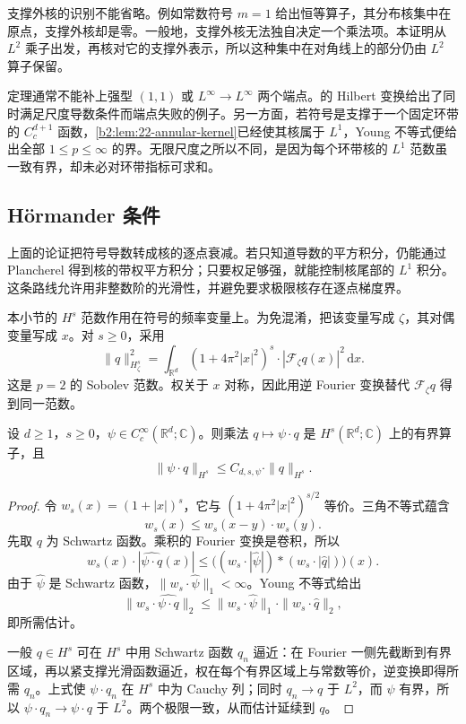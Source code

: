 支撑外核的识别不能省略。例如常数符号 \(m=1\) 给出恒等算子，其分布核集中在原点，支撑外核却是零。一般地，支撑外核无法独自决定一个乘法项。本证明从 \(L^2\) 乘子出发，再核对它的支撑外表示，所以这种集中在对角线上的部分仍由 \(L^2\) 算子保留。

\ProseParagraphBreak
定理通常不能补上强型 \((1,1)\) 或 \(L^\infty\to L^\infty\) 两个端点。的 Hilbert 变换给出了同时满足尺度导数条件而端点失败的例子。另一方面，若符号是支撑于一个固定环带的 \(C_c^{d+1}\) 函数，\cref{b2:lem:22-annular-kernel}已经使其核属于 \(L^1\)，Young 不等式便给出全部 \(1\leq p\leq\infty\) 的界。无限尺度之所以不同，是因为每个环带核的 \(L^1\) 范数虽一致有界，却未必对环带指标可求和。

\subsection{Hörmander 条件}
\label{b2:subsec:220204}

上面的论证把符号导数转成核的逐点衰减。若只知道导数的平方积分，仍能通过 Plancherel 得到核的带权平方积分；只要权足够强，就能控制核尾部的 \(L^1\) 积分。这条路线允许用非整数阶的光滑性，并避免要求极限核存在逐点梯度界。

\ProseParagraphBreak
本小节的 \(H^s\) 范数作用在符号的频率变量上。为免混淆，把该变量写成 \(\zeta\)，其对偶变量写成 \(x\)。对 \(s\geq0\)，采用
\[
 \|q\|_{H^s_\zeta}^2
 =\int_{\mathbb R^d}(1+4\pi^2|x|^2)^s
 \cdot|\mathcal F_\zeta q(x)|^2\,\mathrm dx.
\]
这是 \(p=2\) 的 Sobolev 范数。权关于 \(x\) 对称，因此用逆 Fourier 变换替代 \(\mathcal F_\zeta q\) 得到同一范数。

\begin{lemma}\label{b2:lem:22-sobolev-cutoff}
设 \(d\geq1\)，\(s\geq0\)，\(\psi\in C_c^\infty(\mathbb R^d;\mathbb C)\)。则乘法 \(q\mapsto\psi\cdot q\) 是 \(H^s(\mathbb R^d;\mathbb C)\) 上的有界算子，且
\[
 \|\psi\cdot q\|_{H^s}\leq C_{d,s,\psi}\cdot\|q\|_{H^s}.
\]
\end{lemma}
\begin{proof}
令 \(w_s(x)=(1+|x|)^s\)，它与 \((1+4\pi^2|x|^2)^{s/2}\) 等价。三角不等式蕴含
\[
 w_s(x)\leq w_s(x-y)\cdot w_s(y).
\]
先取 \(q\) 为 Schwartz 函数。乘积的 Fourier 变换是卷积，所以
\[
 w_s(x)\cdot|\widehat{\psi\cdot q}(x)|
 \leq
 \bigl((w_s\cdot|\widehat\psi|)*(w_s\cdot|\widehat q|)\bigr)(x).
\]
由于 \(\widehat\psi\) 是 Schwartz 函数，\(\|w_s\cdot\widehat\psi\|_1<\infty\)。Young 不等式给出
\[
 \|w_s\cdot\widehat{\psi\cdot q}\|_2
 \leq\|w_s\cdot\widehat\psi\|_1
 \cdot\|w_s\cdot\widehat q\|_2,
\]
即所需估计。

一般 \(q\in H^s\) 可在 \(H^s\) 中用 Schwartz 函数 \(q_n\) 逼近：在 Fourier 一侧先截断到有界区域，再以紧支撑光滑函数逼近，权在每个有界区域上与常数等价，逆变换即得所需 \(q_n\)。上式使 \(\psi\cdot q_n\) 在 \(H^s\) 中为 Cauchy 列；同时 \(q_n\to q\) 于 \(L^2\)，而 \(\psi\) 有界，所以 \(\psi\cdot q_n\to\psi\cdot q\) 于 \(L^2\)。两个极限一致，从而估计延续到 \(q\)。
\end{proof}

